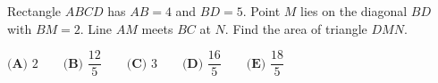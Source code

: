 Rectangle $ABCD$ has $AB=4$ and $BD=5$. Point $M$ lies on the diagonal $BD$ with $BM=2$. Line $AM$ meets $BC$ at $N$. Find the area of triangle $DMN$.

$\textbf{(A) } 2 \qquad \textbf{(B) } \dfrac{12}{5} \qquad \textbf{(C) } 3 \qquad \textbf{(D) } \dfrac{16}{5} \qquad \textbf{(E) } \dfrac{18}{5}$
